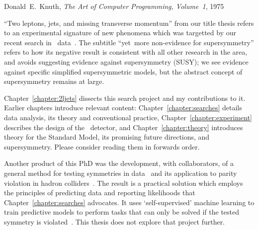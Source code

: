\begin{preface}
\begin{singlespacing}
\begin{epigraphs}
%
{Donald~E.~Knuth,
\textit{The Art of Computer Programming, Volume~1},
1975~\cite{knuth1975art}}
\end{epigraphs}
\end{singlespacing}
\noindent
``Two leptons, jets, and missing transverse momentum'' from our title thesis
refers to an experimental signature of new phenomena which was targetted
by our recent search in \atlas\ data~\cite{atlas2022searches}.
The subtitle ``yet~more non-evidence for supersymmetry'' refers to how its
negative result is consistent with all other research in the area,
and avoids suggesting evidence against supersymmetry (SUSY);
we see evidence against specific simplified supersymmetric models, but the
abstract concept of supersymmetry remains at large.

Chapter~\ref{chapter:2ljets} dissects this search project and my contributions
to it.
Earlier chapters introduce relevant content:
Chapter~\ref{chapter:searches} details data analysis,
its theory and conventional practice,
Chapter~\ref{chapter:experiment} describes the design of the \atlas\ detector,
and
Chapter~\ref{chapter:theory} introduces theory for the Standard Model, its
promising future directions, and supersymmetry.
Please consider reading them in forwards order.

Another product of this PhD was the development, with collaborators, of a
general method for testing symmetries in data~\cite{
lester2021stressed,
tombs2021which
}
and its application to parity violation in hadron colliders~\cite{
lester2022hunting,
Lester:2019bso,
lesterChiralMeasurements2021,
Gripaios:2020hya,
lester2021lorentz
}.
The result is a practical solution which employs the principles of predicting
data and reporting likelihoods that Chapter~\ref{chapter:searches} advocates.
It uses `self-supervised' machine learning to train predictive models to
perform tasks that can only be solved if the tested symmetry is
violated~\cite{
tombs2021which,
pmlr-v139-radford21a,
Noroozi2016jigsaw,
multitaskself2017,
devlin2019bert
}.
This thesis does not explore that project further.
\end{preface}

\tableofcontents

\thispagestyle{empty}
